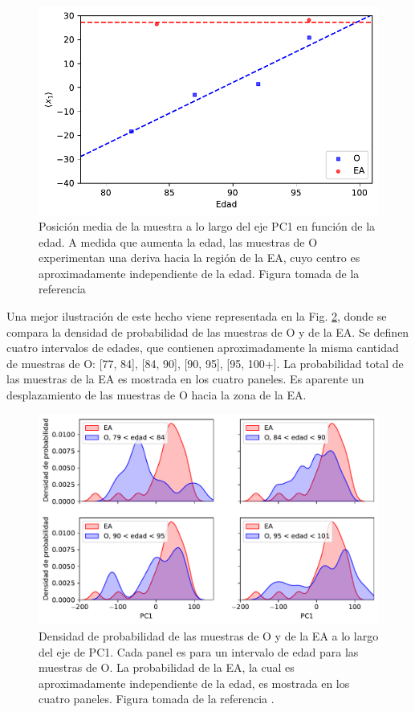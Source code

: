 \begin{figure}[!htb]
	\centering
	\includegraphics[width=0.75\linewidth]{figures/O_to_AD_1}
	\caption{Posición media de la muestra a lo largo del eje PC1 en función de la edad. A medida que aumenta la edad, las muestras de O experimentan una deriva hacia la región de la EA, cuyo centro es aproximadamente independiente de la edad. Figura tomada de la referencia \cite{Gonzalez_2021}}
	\label{fig:otoad}
\end{figure}

Una mejor ilustración de este hecho viene representada en la Fig. \ref{fig:supplotoad}, donde se compara la densidad de probabilidad de las muestras de O y de la EA. Se definen cuatro intervalos de edades, que contienen aproximadamente la misma cantidad de muestras de O: [77, 84], [84, 90], [90, 95], [95, 100+]. La probabilidad total de las muestras de la EA es mostrada en los cuatro paneles. Es aparente un desplazamiento de las muestras de O hacia la zona de la EA.


\begin{figure}[!htb]
	\centering
	\includegraphics[width=0.75\linewidth]{figures/suppl_otoad}
	\caption{Densidad de probabilidad de las muestras de O y de la EA a lo largo del eje de PC1. Cada panel es para un intervalo de edad para las muestras de O. La probabilidad de la EA, la cual es aproximadamente independiente de la edad, es mostrada en los cuatro paneles. Figura tomada de la referencia \cite{Gonzalez_2021}.}
	\label{fig:supplotoad}
\end{figure}

